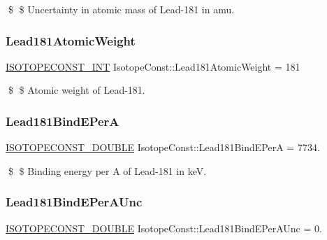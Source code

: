 \$ \$ Uncertainty in atomic mass of Lead-\/181 in amu. \mbox{\label{group___isotope_const-_lead-_pb181_ga2b2a8f2af0e7cf3803239b5c376da559}} 
\subsubsection{\texorpdfstring{Lead181\+Atomic\+Weight}{Lead181AtomicWeight}}
{\footnotesize\ttfamily \mbox{\hyperlink{group___isotope_const-_macros_ga5f18360b3e99483a35c32d789e62621c}{I\+S\+O\+T\+O\+P\+E\+C\+O\+N\+S\+T\+\_\+\+I\+NT}} Isotope\+Const\+::\+Lead181\+Atomic\+Weight = 181}

\$ \$ Atomic weight of Lead-\/181. \mbox{\label{group___isotope_const-_lead-_pb181_ga695bd89dc951a48fec94fc3551c45e21}} 
\subsubsection{\texorpdfstring{Lead181\+Bind\+E\+PerA}{Lead181BindEPerA}}
{\footnotesize\ttfamily \mbox{\hyperlink{group___isotope_const-_macros_ga8f45a7272ce02c0b4c65c44636ed719a}{I\+S\+O\+T\+O\+P\+E\+C\+O\+N\+S\+T\+\_\+\+D\+O\+U\+B\+LE}} Isotope\+Const\+::\+Lead181\+Bind\+E\+PerA = 7734.}

\$ \$ Binding energy per A of Lead-\/181 in keV. \mbox{\label{group___isotope_const-_lead-_pb181_ga9a1f77660161f6fecb8f384a7f87699c}} 
\subsubsection{\texorpdfstring{Lead181\+Bind\+E\+Per\+A\+Unc}{Lead181BindEPerAUnc}}
{\footnotesize\ttfamily \mbox{\hyperlink{group___isotope_const-_macros_ga8f45a7272ce02c0b4c65c44636ed719a}{I\+S\+O\+T\+O\+P\+E\+C\+O\+N\+S\+T\+\_\+\+D\+O\+U\+B\+LE}} Isotope\+Const\+::\+Lead181\+Bind\+E\+Per\+A\+Unc = 0.}

